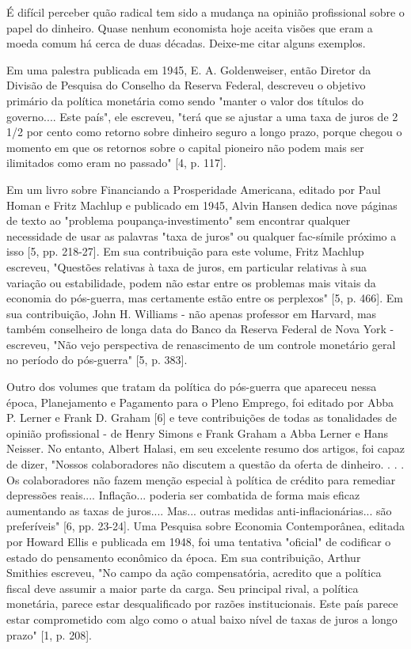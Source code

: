 \documentclass[a4paper,12pt]{article}[abntex2]
\begin{document}
É difícil perceber quão radical tem sido a mudança na opinião profissional sobre o papel do dinheiro. Quase nenhum economista hoje aceita visões que eram a moeda comum há cerca de duas décadas. Deixe-me citar alguns exemplos.

Em uma palestra publicada em 1945, E. A. Goldenweiser, então Diretor da Divisão de Pesquisa do Conselho da Reserva Federal, descreveu o objetivo primário da política monetária como sendo "manter o valor dos títulos do governo.... Este país", ele escreveu, "terá que se ajustar a uma taxa de juros de 2 1/2 por cento como retorno sobre dinheiro seguro a longo prazo, porque chegou o momento em que os retornos sobre o capital pioneiro não podem mais ser ilimitados como eram no passado" [4, p. 117].

Em um livro sobre Financiando a Prosperidade Americana, editado por Paul Homan e Fritz Machlup e publicado em 1945, Alvin Hansen dedica nove páginas de texto ao "problema poupança-investimento" sem encontrar qualquer necessidade de usar as palavras "taxa de juros" ou qualquer fac-símile próximo a isso [5, pp. 218-27]. Em sua contribuição para este volume, Fritz Machlup escreveu, "Questões relativas à taxa de juros, em particular relativas à sua variação ou estabilidade, podem não estar entre os problemas mais vitais da economia do pós-guerra, mas certamente estão entre os perplexos" [5, p. 466]. Em sua contribuição, John H. Williams - não apenas professor em Harvard, mas também conselheiro de longa data do Banco da Reserva Federal de Nova York - escreveu, "Não vejo perspectiva de renascimento de um controle monetário geral no período do pós-guerra" [5, p. 383].

Outro dos volumes que tratam da política do pós-guerra que apareceu nessa época, Planejamento e Pagamento para o Pleno Emprego, foi editado por Abba P. Lerner e Frank D. Graham [6] e teve contribuições de todas as tonalidades de opinião profissional - de Henry Simons e Frank Graham a Abba Lerner e Hans Neisser. No entanto, Albert Halasi, em seu excelente resumo dos artigos, foi capaz de dizer, "Nossos colaboradores não discutem a questão da oferta de dinheiro. . . . Os colaboradores não fazem menção especial à política de crédito para remediar depressões reais.... Inflação... poderia ser combatida de forma mais eficaz aumentando as taxas de juros.... Mas... outras medidas anti-inflacionárias... são preferíveis" [6, pp. 23-24]. Uma Pesquisa sobre Economia Contemporânea, editada por Howard Ellis e publicada em 1948, foi uma tentativa "oficial" de codificar o estado do pensamento econômico da época. Em sua contribuição, Arthur Smithies escreveu, "No campo da ação compensatória, acredito que a política fiscal deve assumir a maior parte da carga. Seu principal rival, a política monetária, parece estar desqualificado por razões institucionais. Este país parece estar comprometido com algo como o atual baixo nível de taxas de juros a longo prazo" [1, p. 208].
\end{document}
